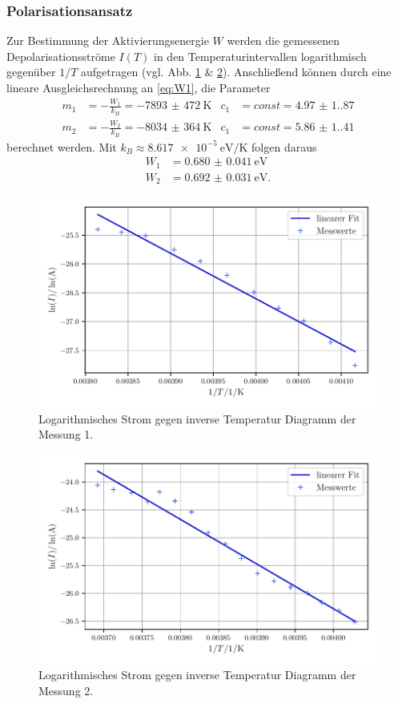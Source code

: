 \subsubsection{Polarisationsansatz}
Zur Bestimmung der Aktivierungsenergie $W$ werden die gemessenen Depolarisationsströme $I(T)$ in den Temperaturintervallen
logarithmisch gegenüber $1/T$ aufgetragen (vgl. Abb. \ref{fig:W1_1} \& \ref{fig:W1_2}). Anschließend können durch eine lineare Ausgleichsrechnung an \autoref{eq:W1}, die Parameter
\begin{align}
    m_1 &= - \frac{W_1}{k_B} = \qty{-7893(472)}{\kelvin} & c_1 &= const = \num{4.97(1.87)} \\
    m_2 &= - \frac{W_2}{k_B} = \qty{-8034(364)}{\kelvin} & c_1 &= const = \num{5.86(1.41)}
\end{align}
berechnet werden. Mit $k_B \approx \qty{8,617e-5}{\electronvolt\per\kelvin}$ folgen daraus
\begin{align}
    W_1 &= \qty{0.680(41)}{\electronvolt} \\
    W_2 &= \qty{0.692(31)}{\electronvolt}.
\end{align}
\begin{figure}
    \centering
    \includegraphics[width=0.8\linewidth]{scripts/build/plot1_1.pdf}
    \caption{Logarithmisches Strom gegen inverse Temperatur Diagramm der Messung 1.}
    \label{fig:W1_1}
\end{figure}
\begin{figure}
    \centering
    \includegraphics[width=0.8\linewidth]{scripts/build/plot2_1.pdf}
    \caption{Logarithmisches Strom gegen inverse Temperatur Diagramm der Messung 2.}
    \label{fig:W1_2}
\end{figure}

